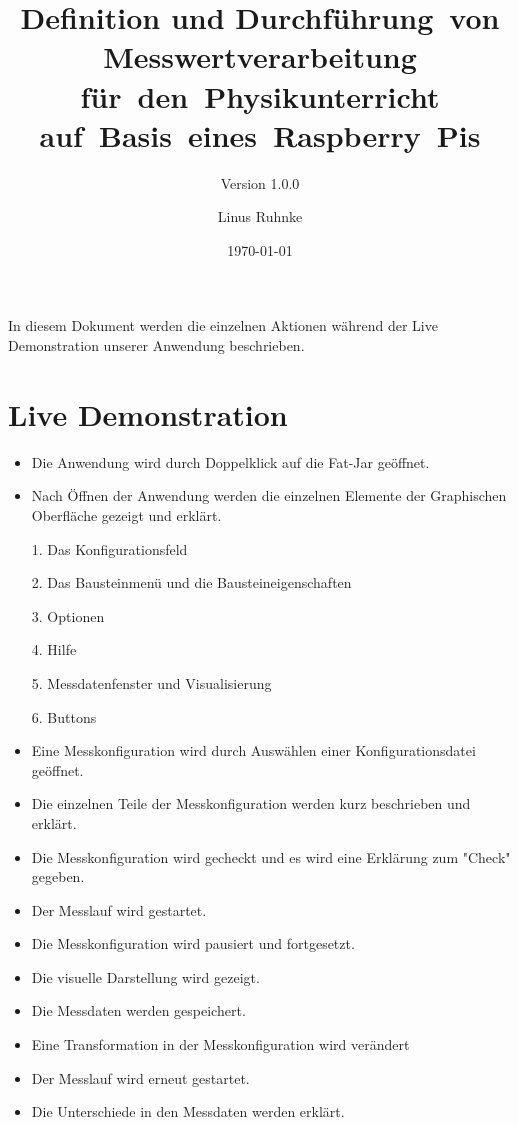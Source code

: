 \documentclass[parskip=full]{scrartcl}
\title{Definition und Durchführung~von Messwertverarbeitung für~den~Physikunterricht auf~Basis~eines~Raspberry~Pis}
\subtitle{Version 1.0.0}
\author{Linus Ruhnke}
\date{\today}
\begin{document}
\maketitle
\clearpage

In diesem Dokument werden die einzelnen Aktionen während der Live Demonstration unserer Anwendung beschrieben.

\section{Live Demonstration}

\begin{itemize}

\item Die Anwendung wird durch Doppelklick auf die Fat-Jar geöffnet.
\item Nach Öffnen der Anwendung werden die einzelnen Elemente der Graphischen Oberfläche gezeigt und erklärt.
\item[1.] Das Konfigurationsfeld
\item[2.] Das Bausteinmenü und die Bausteineigenschaften
\item[3.] Optionen
\item[4.] Hilfe
\item[5.] Messdatenfenster und Visualisierung
\item[6.] Buttons
\item Eine Messkonfiguration wird durch Auswählen einer Konfigurationsdatei geöffnet.
\item Die einzelnen Teile der Messkonfiguration werden kurz beschrieben und erklärt.
\item Die Messkonfiguration wird gecheckt und es wird eine Erklärung zum "Check" gegeben.
\item Der Messlauf wird gestartet.
\item Die Messkonfiguration wird pausiert und fortgesetzt.
\item Die visuelle Darstellung wird gezeigt.
\item Die Messdaten werden gespeichert.
\item Eine Transformation in der Messkonfiguration wird verändert 
\item Der Messlauf wird erneut gestartet.
\item Die Unterschiede in den Messdaten werden erklärt.

\end{itemize}


\renewcommand*{\glossarysection}[2][]{}	%
\printnoidxglossaries				%
\end{document}
